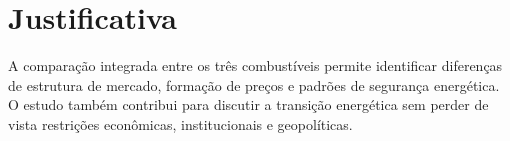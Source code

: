 \section{Justificativa}

A compara\c{c}\~ao integrada entre os tr\^es combust\'iveis permite identificar diferen\c{c}as de estrutura de mercado, forma\c{c}\~ao de pre\c{c}os e padr\~oes de seguran\c{c}a energ\'etica. O estudo tamb\'em contribui para discutir a transi\c{c}\~ao energ\'etica sem perder de vista restri\c{c}\~oes econ\^omicas, institucionais e geopol\'iticas.
